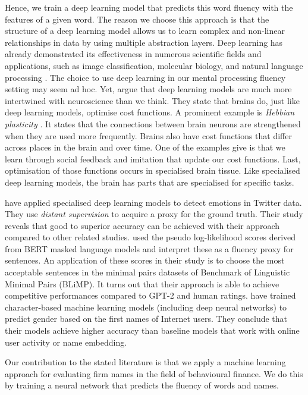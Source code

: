 \documentclass[11pt]{article}
\begin{document}
Hence, we train a deep learning model that predicts this word fluency with the features of a given word. The reason we choose this approach is that the structure of a deep learning model allows us to learn complex and non-linear relationships in data by using multiple abstraction layers. Deep learning has already demonstrated its effectiveness in numerous scientific fields and applications, such as image classification, molecular biology, and natural language processing \citep{lecun2015deep}. The choice to use deep learning in our mental processing fluency setting may seem ad hoc. Yet, \cite{marblestone2016toward} argue that deep learning models are much more intertwined with neuroscience than we think. They state that brains do, just like deep learning models, optimise cost functions. A prominent example is \textit{Hebbian plasticity}
\citep{hebb2005organization}. It states that the connections between brain neurons are strengthened when they are used more frequently.
Brains also have cost functions that differ across places in the brain and over time. One of the examples \cite{marblestone2016toward} give is that we learn through social feedback and imitation that update our cost functions. 
Last, optimisation of those functions occurs in specialised brain tissue. Like specialised deep learning models, the brain has parts that are specialised for specific tasks.

\cite{abdul2017emonet} have applied specialised deep learning models to detect emotions in Twitter data. They use \textit{distant supervision} to acquire a proxy for the ground truth. Their study reveals that good to superior accuracy can be achieved with their approach compared to other related studies. 
\cite{salazar2020} used the pseudo log-likelihood scores derived from BERT masked language models and interpret these as a fluency proxy for sentences. An application of these scores in their study is to choose the most acceptable sentences in the minimal pairs datasets of Benchmark of Linguistic
Minimal Pairs (BLiMP). It turns out that their approach is able to achieve competitive performances compared to GPT-2 and human ratings. \cite{hu2021s} have trained character-based machine learning models (including deep neural networks) to predict gender based on the first names of Internet users. They conclude that their models achieve higher accuracy than baseline models that work with online user activity or name embedding. 

Our contribution to the stated literature is that we apply a machine learning approach for evaluating firm names in the field of behavioural finance. We do this by training a neural network that predicts the fluency of words and names.
\end{document}
